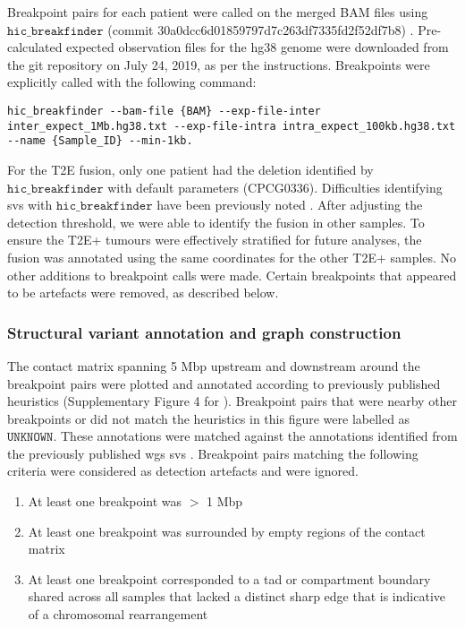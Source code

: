 Breakpoint pairs for each patient were called on the merged BAM files using $\texttt{hic\_breakfinder}$ (commit 30a0dcc6d01859797d7c263df7335fd2f52df7b8) \cite{dixonIntegrativeDetectionAnalysis2018}.
Pre-calculated expected observation files for the hg38 genome were downloaded from the git repository on July 24, 2019, as per the instructions.
Breakpoints were explicitly called with the following command:

\begin{lstlisting}[basicstyle=\ttfamily]
hic_breakfinder --bam-file {BAM} --exp-file-inter inter_expect_1Mb.hg38.txt --exp-file-intra intra_expect_100kb.hg38.txt --name {Sample_ID} --min-1kb.
\end{lstlisting}

For the T2E fusion, only one patient had the deletion identified by $\texttt{hic\_breakfinder}$ with default parameters (CPCG0336).
Difficulties identifying \glspl{sv} with $\texttt{hic\_breakfinder}$ have been previously noted \cite{hoStructuralVariationSequencing2020}.
After adjusting the detection threshold, we were able to identify the fusion in other samples.
To ensure the T2E+ tumours were effectively stratified for future analyses, the fusion was annotated using the same coordinates for the other T2E+ samples.
No other additions to breakpoint calls were made.
Certain breakpoints that appeared to be artefacts were removed, as described below.

\subsubsection{Structural variant annotation and graph construction}

The contact matrix spanning 5 Mbp upstream and downstream around the breakpoint pairs were plotted and annotated according to previously published heuristics (Supplementary Figure 4 for \cite{dixonIntegrativeDetectionAnalysis2018}).
Breakpoint pairs that were nearby other breakpoints or did not match the heuristics in this figure were labelled as $\texttt{UNKNOWN}$.
These annotations were matched against the annotations identified from the previously published \gls{wgs} \glspl{sv} \cite{fraserGenomicHallmarksLocalized2017}.
Breakpoint pairs matching the following criteria were considered as detection artefacts and were ignored.

\begin{enumerate}
  \item At least one breakpoint was $>$ 1 Mbp
  \item At least one breakpoint was surrounded by empty regions of the contact matrix
  \item At least one breakpoint corresponded to a \gls{tad} or compartment boundary shared across all samples that lacked a distinct sharp edge that is indicative of a chromosomal rearrangement
\end{enumerate}

